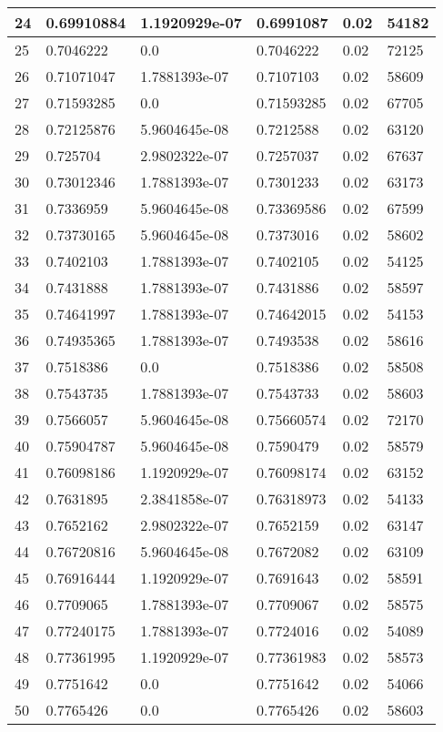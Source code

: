 \begin{longtable}{|l|l|l|l|l|l|}
24 & 0.69910884 & 1.1920929e-07 & 0.6991087 & 0.02 & 54182 \\ \hline 
25 & 0.7046222 & 0.0 & 0.7046222 & 0.02 & 72125 \\ \hline 
26 & 0.71071047 & 1.7881393e-07 & 0.7107103 & 0.02 & 58609 \\ \hline 
27 & 0.71593285 & 0.0 & 0.71593285 & 0.02 & 67705 \\ \hline 
28 & 0.72125876 & 5.9604645e-08 & 0.7212588 & 0.02 & 63120 \\ \hline 
29 & 0.725704 & 2.9802322e-07 & 0.7257037 & 0.02 & 67637 \\ \hline 
30 & 0.73012346 & 1.7881393e-07 & 0.7301233 & 0.02 & 63173 \\ \hline 
31 & 0.7336959 & 5.9604645e-08 & 0.73369586 & 0.02 & 67599 \\ \hline 
32 & 0.73730165 & 5.9604645e-08 & 0.7373016 & 0.02 & 58602 \\ \hline 
33 & 0.7402103 & 1.7881393e-07 & 0.7402105 & 0.02 & 54125 \\ \hline 
34 & 0.7431888 & 1.7881393e-07 & 0.7431886 & 0.02 & 58597 \\ \hline 
35 & 0.74641997 & 1.7881393e-07 & 0.74642015 & 0.02 & 54153 \\ \hline 
36 & 0.74935365 & 1.7881393e-07 & 0.7493538 & 0.02 & 58616 \\ \hline 
37 & 0.7518386 & 0.0 & 0.7518386 & 0.02 & 58508 \\ \hline 
38 & 0.7543735 & 1.7881393e-07 & 0.7543733 & 0.02 & 58603 \\ \hline 
39 & 0.7566057 & 5.9604645e-08 & 0.75660574 & 0.02 & 72170 \\ \hline 
40 & 0.75904787 & 5.9604645e-08 & 0.7590479 & 0.02 & 58579 \\ \hline 
41 & 0.76098186 & 1.1920929e-07 & 0.76098174 & 0.02 & 63152 \\ \hline 
42 & 0.7631895 & 2.3841858e-07 & 0.76318973 & 0.02 & 54133 \\ \hline 
43 & 0.7652162 & 2.9802322e-07 & 0.7652159 & 0.02 & 63147 \\ \hline 
44 & 0.76720816 & 5.9604645e-08 & 0.7672082 & 0.02 & 63109 \\ \hline 
45 & 0.76916444 & 1.1920929e-07 & 0.7691643 & 0.02 & 58591 \\ \hline 
46 & 0.7709065 & 1.7881393e-07 & 0.7709067 & 0.02 & 58575 \\ \hline 
47 & 0.77240175 & 1.7881393e-07 & 0.7724016 & 0.02 & 54089 \\ \hline 
48 & 0.77361995 & 1.1920929e-07 & 0.77361983 & 0.02 & 58573 \\ \hline 
49 & 0.7751642 & 0.0 & 0.7751642 & 0.02 & 54066 \\ \hline 
50 & 0.7765426 & 0.0 & 0.7765426 & 0.02 & 58603 \\ \hline 
\end{longtable}